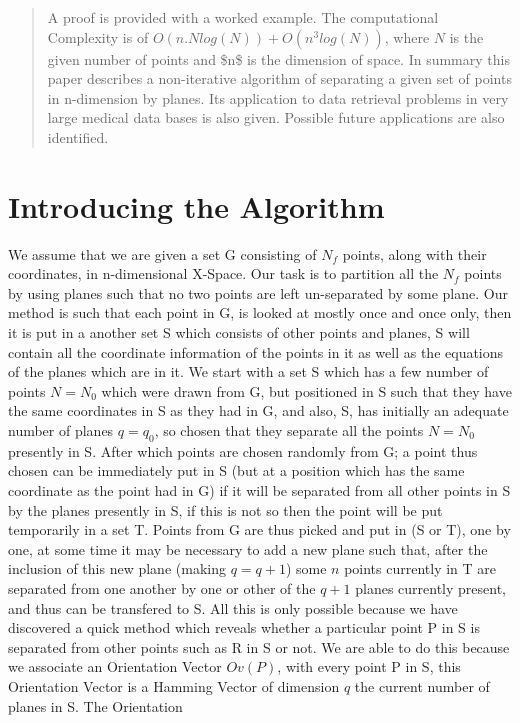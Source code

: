 \documentclass[english]{article}
\begin{document}
\begin{abstract}
A proof is provided with a worked example. The computational Complexity
is of $O(n.N log(N)) + O(n^3 log(N))$, where $N$ is the given number
of points and \$n\$ is the dimension of space. In summary this paper
describes a non-iterative algorithm of separating a given set of points
in n-dimension by planes. Its application to data retrieval problems
in very large medical data bases is also given. Possible future applications are also identified.
\end{abstract}

\section{Introducing the Algorithm}
We assume that we are given a set G consisting of $N_{f}$ points, along with 
their coordinates, in n-dimensional X-Space. Our task is to partition all the $N_{f}$
points by using planes such that no two points are left un-separated
by some plane. Our method is such that each point in G, is looked
at mostly once and once only, then it is put in a another set S which
consists of other points and planes, S will contain all the coordinate
information of the points in it as well as the equations of the planes
which are in it. We start with a set S which has a few number of points
$N=N_{0}$ which were drawn from G, but positioned in S such that they have the same coordinates in S as they had in G, and also, S, has initially an adequate
number of planes $q=q_{0}$, so chosen that they separate all the
points $N=N_{0}$ presently in S. After which points are chosen randomly
from G; a point thus chosen can be immediately put in S (but at a position which has the same coordinate as the point had in G) if it will
be separated from all other points in S by the planes presently in
S, if this is not so then the point will be put temporarily in a set
T. Points from G are thus picked and put in (S or T), one by one,
at some time it may be necessary to add a new plane such that, after
the inclusion of this new plane (making $q=q+1$) some $n$ points
currently in T are separated from one another by one or other of the
$q+1$ planes currently present, and thus can be transfered to S.
All this is only possible because we have discovered a quick method
which reveals whether a particular point P in S is separated from
other points such as R in S or not. We are able to do this because
we associate an \textquotedbl{}Orientation Vector\textquotedbl{} $Ov(P)$,
with every point P in S, this Orientation Vector is a Hamming Vector
of dimension $q$ the current number of planes in S. The Orientation
\end{document}
